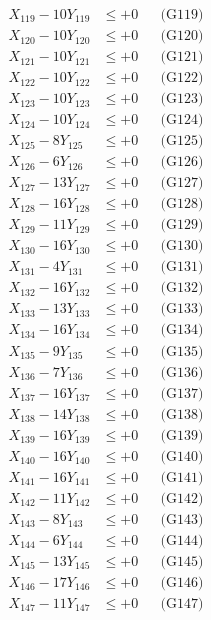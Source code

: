 \documentclass[a4paper,10pt]{article}
\begin{document}
{\begin{align}
X_{119} - 10Y_{119} &\leq +0 && \text{(G119)} \\
X_{120} - 10Y_{120} &\leq +0 && \text{(G120)} \\
X_{121} - 10Y_{121} &\leq +0 && \text{(G121)} \\
X_{122} - 10Y_{122} &\leq +0 && \text{(G122)} \\
X_{123} - 10Y_{123} &\leq +0 && \text{(G123)} \\
X_{124} - 10Y_{124} &\leq +0 && \text{(G124)} \\
X_{125} - 8Y_{125} &\leq +0 && \text{(G125)} \\
X_{126} - 6Y_{126} &\leq +0 && \text{(G126)} \\
X_{127} - 13Y_{127} &\leq +0 && \text{(G127)} \\
\allowbreak
X_{128} - 16Y_{128} &\leq +0 && \text{(G128)} \\
X_{129} - 11Y_{129} &\leq +0 && \text{(G129)} \\
X_{130} - 16Y_{130} &\leq +0 && \text{(G130)} \\
X_{131} - 4Y_{131} &\leq +0 && \text{(G131)} \\
X_{132} - 16Y_{132} &\leq +0 && \text{(G132)} \\
X_{133} - 13Y_{133} &\leq +0 && \text{(G133)} \\
X_{134} - 16Y_{134} &\leq +0 && \text{(G134)} \\
X_{135} - 9Y_{135} &\leq +0 && \text{(G135)} \\
X_{136} - 7Y_{136} &\leq +0 && \text{(G136)} \\
X_{137} - 16Y_{137} &\leq +0 && \text{(G137)} \\
\allowbreak
X_{138} - 14Y_{138} &\leq +0 && \text{(G138)} \\
X_{139} - 16Y_{139} &\leq +0 && \text{(G139)} \\
X_{140} - 16Y_{140} &\leq +0 && \text{(G140)} \\
X_{141} - 16Y_{141} &\leq +0 && \text{(G141)} \\
X_{142} - 11Y_{142} &\leq +0 && \text{(G142)} \\
X_{143} - 8Y_{143} &\leq +0 && \text{(G143)} \\
X_{144} - 6Y_{144} &\leq +0 && \text{(G144)} \\
X_{145} - 13Y_{145} &\leq +0 && \text{(G145)} \\
X_{146} - 17Y_{146} &\leq +0 && \text{(G146)} \\
X_{147} - 11Y_{147} &\leq +0 && \text{(G147)} \\
\allowbreak

\end{align}}
\end{document}
